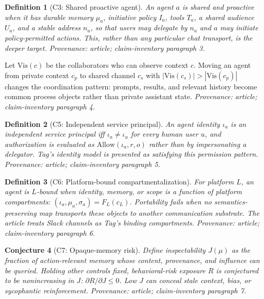 \documentclass[11pt,a4paper]{article}
\newtheorem{definition}{Definition}[section]
\newtheorem{conjecture}[definition]{Conjecture}
\begin{document}
\begin{definition}[C3: Shared proactive agent]
An agent $a$ is shared and proactive when it has durable memory $\mu_a$,
initiative policy $I_a$, tools $T_a$, a shared audience $U_a$, and a stable
address $n_a$, so that users may delegate by $n_a$ and $a$ may initiate
policy-permitted actions.  This, rather than any particular chat transport,
is the deeper target.  \emph{Provenance: article; claim-inventory paragraph 3.}
\end{definition}

\begin{claim}
Let $\mathrm{Vis}(c)$ be the collaborators who can observe context $c$.
Moving an agent from private context $c_p$ to shared channel $c_s$ with
$|\mathrm{Vis}(c_s)|>|\mathrm{Vis}(c_p)|$ changes the coordination pattern:
prompts, results, and relevant history become common process objects rather
than private assistant state.  \emph{Provenance: article; claim-inventory
paragraph 4.}
\end{claim}

\begin{definition}[C5: Independent service principal]
An agent identity $\iota_a$ is an independent service principal iff
$\iota_a\neq\iota_u$ for every human user $u$, and authorization is evaluated
as $\mathrm{Allow}(\iota_a,r,o)$ rather than by impersonating a delegator.
Tag's identity model is presented as satisfying this permission pattern.
\emph{Provenance: article; claim-inventory paragraph 5.}
\end{definition}

\begin{definition}[C6: Platform-bound compartmentalization]
For platform $L$, an agent is $L$-bound when identity, memory, or scope is a
function of platform compartments: $(\iota_a,\mu_a,\sigma_a)=F_L(c_L)$.
Portability fails when no semantics-preserving map transports these objects
to another communication substrate.  The article treats Slack channels as
Tag's binding compartments.  \emph{Provenance: article; claim-inventory
paragraph 6.}
\end{definition}

\begin{conjecture}[C7: Opaque-memory risk]
Define inspectability $J(\mu)$ as the fraction of action-relevant memory whose
content, provenance, and influence can be queried.  Holding other controls
fixed, behavioral-risk exposure $R$ is conjectured to be nonincreasing in
$J$: $\partial R/\partial J\leq 0$.  Low $J$ can conceal stale context, bias,
or sycophantic reinforcement.  \emph{Provenance: article; claim-inventory
paragraph 7.}
\end{conjecture}
\end{document}
